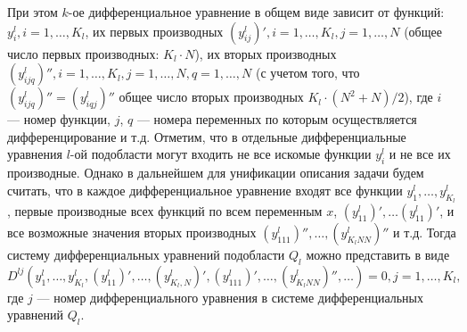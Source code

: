 \documentclass[a4paper,11pt,numreferences,mathsec,kaplist]{isuepsutf8}
\begin{document}
\begin{article}
При этом $k$-ое дифференциальное уравнение в общем виде зависит от функций:
$y^l_i, i = 1,\ldots,K_l$, их первых производных $(y^l_{ij})', i =
1,\ldots,K_l, j = 1, \ldots, N$ (общее число первых производных: $K_l \cdot
N$), их вторых производных $(y^l_{ijq})'', i = 1,\ldots,K_l, j =
1,\ldots,N, q = 1,\ldots,N$ (с учетом того, что $(y^l_{ijq})'' =
(y^l_{iqj})''$ общее число вторых производных $K_l \cdot (N^2+N) / 2$),
где $i$ --- номер функции, $j$, $q$ --- номера переменных по которым
осуществляется дифференцирование и т.д. Отметим, что в отдельные 
дифференциальные уравнения $l$-ой подобласти могут входить не все
искомые функции $y^l_i$ и не все их производные.  Однако в дальнейшем
для унификации описания задачи будем считать, что в каждое
дифференциальное уравнение входят все функции
$y^l_1,\ldots,y^l_{K_l}$, первые производные всех функций по всем
переменным $x$, $(y^l_{11})', \ldots (y^l_{11})'$, и все возможные
значения вторых производных $(y^l_{111})'', \ldots, (y^l_{K_lNN})''$ и
т.д. Тогда систему дифференциальных уравнений подобласти $Q_l$ можно
представить в виде
\begin{equation}
    D^{lj}(y^l_1,\ldots,y^l_{K_l}, (y^l_{11})',\ldots, (y^l_{K_l,N})',
           (y^l_{111})',\ldots, (y^l_{K_lNN})'',\ldots) = 0,
           j = 1, \ldots, K_l,
    \label{pde}
\end{equation}
где $j$ --- номер дифференциального уравнения в 
системе дифференциальных уравнений $Q_l$.


\end{article}
\end{document}
